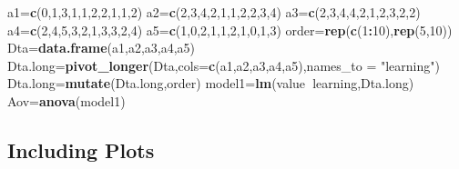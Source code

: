 \documentclass[
]{article}
\newenvironment{Shaded}{\begin{snugshade}}{\end{snugshade}}
\newcommand{\DataTypeTok}[1]{\textcolor[rgb]{0.13,0.29,0.53}{#1}}
\newcommand{\DecValTok}[1]{\textcolor[rgb]{0.00,0.00,0.81}{#1}}
\newcommand{\KeywordTok}[1]{\textcolor[rgb]{0.13,0.29,0.53}{\textbf{#1}}}
\newcommand{\NormalTok}[1]{#1}
\newcommand{\OperatorTok}[1]{\textcolor[rgb]{0.81,0.36,0.00}{\textbf{#1}}}
\newcommand{\StringTok}[1]{\textcolor[rgb]{0.31,0.60,0.02}{#1}}
\begin{document}
\begin{Shaded}
\begin{Highlighting}[]
\NormalTok{a1=}\KeywordTok{c}\NormalTok{(}\DecValTok{0}\NormalTok{,}\DecValTok{1}\NormalTok{,}\DecValTok{3}\NormalTok{,}\DecValTok{1}\NormalTok{,}\DecValTok{1}\NormalTok{,}\DecValTok{2}\NormalTok{,}\DecValTok{2}\NormalTok{,}\DecValTok{1}\NormalTok{,}\DecValTok{1}\NormalTok{,}\DecValTok{2}\NormalTok{)}
\NormalTok{a2=}\KeywordTok{c}\NormalTok{(}\DecValTok{2}\NormalTok{,}\DecValTok{3}\NormalTok{,}\DecValTok{4}\NormalTok{,}\DecValTok{2}\NormalTok{,}\DecValTok{1}\NormalTok{,}\DecValTok{1}\NormalTok{,}\DecValTok{2}\NormalTok{,}\DecValTok{2}\NormalTok{,}\DecValTok{3}\NormalTok{,}\DecValTok{4}\NormalTok{)}
\NormalTok{a3=}\KeywordTok{c}\NormalTok{(}\DecValTok{2}\NormalTok{,}\DecValTok{3}\NormalTok{,}\DecValTok{4}\NormalTok{,}\DecValTok{4}\NormalTok{,}\DecValTok{2}\NormalTok{,}\DecValTok{1}\NormalTok{,}\DecValTok{2}\NormalTok{,}\DecValTok{3}\NormalTok{,}\DecValTok{2}\NormalTok{,}\DecValTok{2}\NormalTok{)}
\NormalTok{a4=}\KeywordTok{c}\NormalTok{(}\DecValTok{2}\NormalTok{,}\DecValTok{4}\NormalTok{,}\DecValTok{5}\NormalTok{,}\DecValTok{3}\NormalTok{,}\DecValTok{2}\NormalTok{,}\DecValTok{1}\NormalTok{,}\DecValTok{3}\NormalTok{,}\DecValTok{3}\NormalTok{,}\DecValTok{2}\NormalTok{,}\DecValTok{4}\NormalTok{)}
\NormalTok{a5=}\KeywordTok{c}\NormalTok{(}\DecValTok{1}\NormalTok{,}\DecValTok{0}\NormalTok{,}\DecValTok{2}\NormalTok{,}\DecValTok{1}\NormalTok{,}\DecValTok{1}\NormalTok{,}\DecValTok{2}\NormalTok{,}\DecValTok{1}\NormalTok{,}\DecValTok{0}\NormalTok{,}\DecValTok{1}\NormalTok{,}\DecValTok{3}\NormalTok{)}
\NormalTok{order=}\KeywordTok{rep}\NormalTok{(}\KeywordTok{c}\NormalTok{(}\DecValTok{1}\OperatorTok{:}\DecValTok{10}\NormalTok{),}\KeywordTok{rep}\NormalTok{(}\DecValTok{5}\NormalTok{,}\DecValTok{10}\NormalTok{))}
\NormalTok{Dta=}\KeywordTok{data.frame}\NormalTok{(a1,a2,a3,a4,a5)}
\NormalTok{Dta.long=}\KeywordTok{pivot_longer}\NormalTok{(Dta,}\DataTypeTok{cols=}\KeywordTok{c}\NormalTok{(a1,a2,a3,a4,a5),}\DataTypeTok{names_to =} \StringTok{"learning"}\NormalTok{)}
\NormalTok{Dta.long=}\KeywordTok{mutate}\NormalTok{(Dta.long,order)}
\NormalTok{model1=}\KeywordTok{lm}\NormalTok{(value}\OperatorTok{~}\NormalTok{learning,Dta.long)}
\NormalTok{Aov=}\KeywordTok{anova}\NormalTok{(model1)}
\end{Highlighting}
\end{Shaded}

\hypertarget{including-plots}{%
\subsection{Including Plots}\label{including-plots}}
\end{document}
